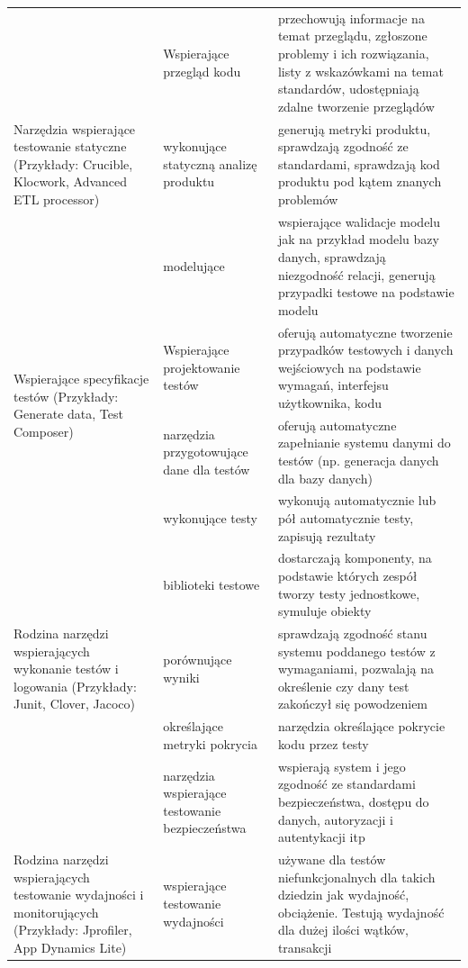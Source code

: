 \begin{longtable}{| p{4cm} | p{4cm} | p{8cm} |}
\multirow{3}{4cm}{Narzędzia wspierające testowanie statyczne (Przykłady: Crucible\cite{crucible}, Klocwork\cite{klocwork}, Advanced ETL processor\cite{etlProcessor})} &
Wspierające przegląd kodu & przechowują informacje na temat przeglądu, zgłoszone problemy i ich rozwiązania, listy z wskazówkami na temat standardów, udostępniają zdalne tworzenie przeglądów\\ \cline{2-3}
& wykonujące statyczną analizę produktu & generują metryki produktu, sprawdzają zgodność ze standardami, sprawdzają kod produktu pod kątem znanych problemów\\ \cline{2-3}
&  modelujące  & wspierające walidacje modelu jak na przykład modelu bazy danych, sprawdzają niezgodność relacji, generują przypadki testowe na podstawie modelu\\ \hline
\hline
\multirow{2}{4cm}{Wspierające specyfikacje testów (Przykłady: Generate data\cite{generateData}, Test Composer\cite{testComposer})} &
Wspierające projektowanie testów & oferują automatyczne tworzenie przypadków testowych i danych wejściowych na podstawie wymagań, interfejsu użytkownika, kodu\\ \cline{2-3}
& narzędzia przygotowujące dane dla testów & oferują automatyczne zapełnianie systemu danymi do testów (np. generacja danych dla bazy danych)\\ \cline{2-3}
\hline
\multirow{5}{4cm}{Rodzina narzędzi wspierających wykonanie testów i logowania (Przykłady: Junit\cite{junit}, Clover\cite{clover}, Jacoco\cite{jacoco})} &
wykonujące testy & wykonują automatycznie lub pół automatycznie testy, zapisują rezultaty\\ \cline{2-3}
& biblioteki testowe & dostarczają komponenty, na podstawie których zespół tworzy testy jednostkowe, symuluje obiekty\\ \cline{2-3}
&  porównujące wyniki & sprawdzają zgodność stanu systemu poddanego testów z wymaganiami, pozwalają na określenie czy dany test zakończył się powodzeniem\\ \cline{2-3}
& określające metryki pokrycia & narzędzia określające pokrycie kodu przez testy \\ \cline{2-3}
& narzędzia wspierające testowanie bezpieczeństwa & wspierają system i jego zgodność ze standardami bezpieczeństwa, dostępu do danych, autoryzacji i autentykacji itp\\ \hline
\hline
\multirow{5}{4cm}{Rodzina narzędzi wspierających testowanie wydajności i monitorujących (Przykłady: Jprofiler\cite{jprofiler}, App Dynamics Lite\cite{appdynamic})}&
 wspierające testowanie wydajności & używane dla testów niefunkcjonalnych dla takich dziedzin jak wydajność, obciążenie. Testują wydajność dla dużej ilości wątków, transakcji \\ \cline{2-3}

\end{longtable}
